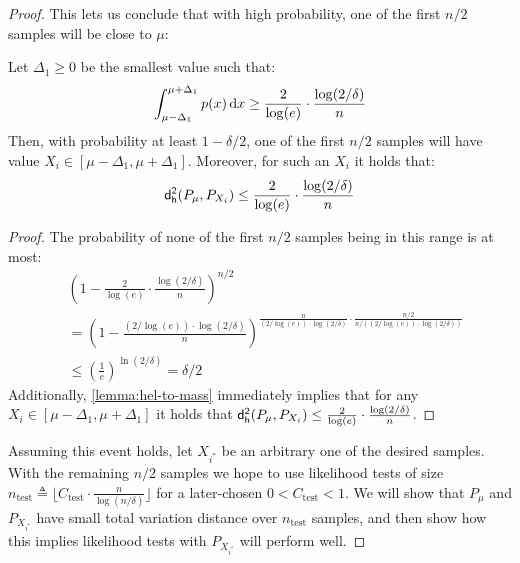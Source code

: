 \begin{proof}
This lets us conclude that with high probability, one of the first $n/2$ samples will be close to $\mu$:

\begin{corollary}\label{cor:cand-good}
    Let $\Delta_1 \ge 0$ be the smallest value such that:
    \begin{equation*}
        \int_{\mu - \Delta_1}^{\mu + \Delta_1} p(x) \mathop{}\!\mathrm{d} x \ge \frac{2}{\log(e)} \cdot \frac{\log(2/\delta)}{n}
    \end{equation*}
    Then, with probability at least $1-\delta/2$, one of the first $n/2$ samples will have value $X_i \in [\mu-\Delta_1,\mu+\Delta_1]$. Moreover, for such an $X_i$ it holds that:
    \begin{equation*}
        \mathsf{d_{h}^2}(P_\mu,P_{X_i}) \le \frac{2}{\log(e)} \cdot \frac{\log(2/\delta)}{n}
    \end{equation*}
\end{corollary}
\begin{proof}
    The probability of none of the first $n/2$ samples being in this range is at most:
    \begin{align*}
        & \left(1- \frac{2}{\log(e)} \cdot \frac{\log(2/\delta)}{n}\right)^{n/2} \\
        & = \left(1 - \frac{(2/\log(e)) \cdot \log(2/\delta)}{n}\right)^{\frac{n}{(2/\log(e))\cdot \log(2/\delta)} \cdot \frac{n/2}{n/((2/\log(e)) \cdot \log(2/\delta))}} \\
        & \le \left(\frac{1}{e}\right)^{\ln(2/\delta)} = \delta/2
    \end{align*}
    Additionally, \cref{lemma:hel-to-mass} immediately implies that for any $X_i \in [\mu - \Delta_1,\mu + \Delta_1]$ it holds that $\mathsf{d_{h}^2}(P_\mu,P_{X_i}) \le \frac{2}{\log(e)} \cdot \frac{\log(2/\delta)}{n}$.
\end{proof}

Assuming this event holds, let $X_{i^*}$ be an arbitrary one of the desired samples. With the remaining $n/2$ samples we hope to use likelihood tests of size $n_{\textrm{test}} \triangleq \lfloor C_{\textrm{test}} \cdot \frac{n}{\log(n/\delta)} \rfloor$ for a later-chosen $0<C_{\textrm{test}}<1$. We will show that $P_\mu$ and $P_{X_{i^*}}$ have small total variation distance over $n_{\textrm{test}}$ samples, and then show how this implies likelihood tests with $P_{X_{i^*}}$ will perform well.


\end{proof}
